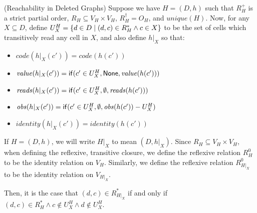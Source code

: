 \begin{lemma}{(Reachability in Deleted Graphs)}
Suppose we have $H = (D,h)$ such that $R^+_H$ is a strict partial
order, $R_H \subseteq V_H \times V_H$, $R^\dagger_H = O_H$, and
$\mathit{unique}(H)$.  Now, for any $X \subseteq D$, define $U^H_X =
\{{{d \in D}\;|\;{(d, c) \in R^*_H \land c \in X}}\}$ to be the set
of cells which transitively read any cell in $X$, and also define
$h|_X$ so that:
\begin{itemize}
\item $\mathit{code}(h|_X(c')) = \mathit{code}(h(c'))$
\item $\mathit{value}(h|_X(c')) = \mathsf{if}({c' \in U^H_X}, {\mathsf{None}}, {\mathit{value}(h(c'))})$
\item $\mathit{reads}(h|_X(c')) = \mathsf{if}({c' \in U^H_X}, {\emptyset}, {\mathit{reads}(h(c'))})$
\item $\mathit{obs}(h|_X(c')) = \mathsf{if}({c' \in U^H_X}, {\emptyset}, {\mathit{obs}(h(c')) - U^H_X})$
\item $\mathit{identity}(h|_X(c')) = \mathit{identity}(h(c'))$
\end{itemize}
If $H = (D,h)$, we will write $H|_X$ to mean $(D,h|_X)$. Since $R_H \subseteq V_H \times V_H$,
when defining the reflexive, transitive closure, we define the reflexive relation  $R^0_H$ to be the 
identity relation on $V_H$. Similarly, we define the reflexive relation  $R^0_{H|_X}$ to be the 
identity relation on $V_{H|_X}$. 

Then, it is the case that $(d,c) \in R^*_{H|_X}$ if and only if $(d,c) \in R^*_H \land c \not\in U^H_X \land d \not\in U^H_X$. 
\end{lemma}

